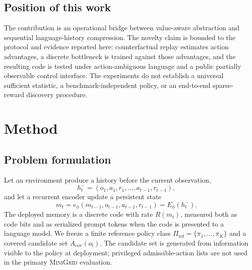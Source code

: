 \documentclass[11pt]{article}
\newcommand{\minigrid}{\textsc{MiniGrid}}
\begin{document}
\subsection{Position of this work}
The contribution is an operational bridge between value-aware abstraction and sequential language-history compression. The novelty claim is bounded to the protocol and evidence reported here: counterfactual replay estimates action advantages, a discrete bottleneck is trained against those advantages, and the resulting code is tested under action-ambiguous language and a public partially observable control interface. The experiments do not establish a universal sufficient statistic, a benchmark-independent policy, or an end-to-end sparse-reward discovery procedure.

\section{Method}
\subsection{Problem formulation}
Let an environment produce a history before the current observation,
\begin{equation}
h_t^-=(o_1,a_1,r_1,\ldots,a_{t-1},r_{t-1}),
\end{equation}
and let a recurrent encoder update a persistent state
\begin{equation}
m_t=e_\phi(m_{t-1},o_{t-1},a_{t-1},r_{t-1})=E_\phi(h_t^-).
\end{equation}
The deployed memory is a discrete code with rate $R(m_t)$, measured both as code bits and as serialized prompt tokens when the code is presented to a language model. We freeze a finite reference policy class $\Pi_{\mathrm{ref}}=\{\pi_1,\ldots,\pi_K\}$ and a covered candidate set $A_{\mathrm{cov}}(o_t)$. The candidate set is generated from information visible to the policy at deployment; privileged admissible-action lists are not used in the primary \minigrid{} evaluation.
\end{document}
